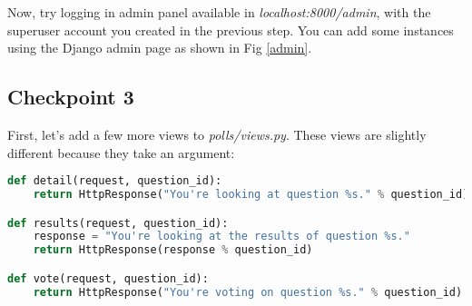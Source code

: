 \documentclass{homework}
\begin{document}
Now, try logging in admin panel available in \textit{localhost:8000/admin}, with the superuser account you created in the previous step. You can add some instances using the Django admin page as shown in Fig \ref{admin}.

\subsection*{Checkpoint 3}
First, let’s add a few more views to \textit{polls/views.py}. These views are slightly different because they take an argument:
\begin{lstlisting}[language=Python]
def detail(request, question_id):
    return HttpResponse("You're looking at question %s." % question_id)

def results(request, question_id):
    response = "You're looking at the results of question %s."
    return HttpResponse(response % question_id)

def vote(request, question_id):
    return HttpResponse("You're voting on question %s." % question_id)
\end{lstlisting}
\end{document}
